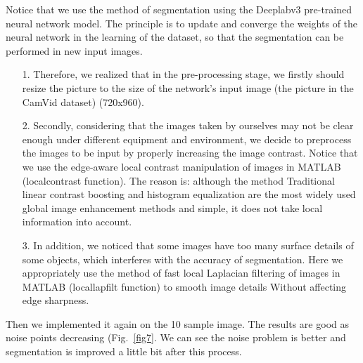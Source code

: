 \documentclass[10pt]{article}
\theoremstyle{nonumberplain}
\begin{document}
Notice that we use the method of segmentation using the Deeplabv3 pre-trained neural network model. The principle is to update and converge the weights of the neural network in the learning of the dataset, so that the segmentation can be performed in new input images. 

\begin{itemize}[itemsep=2pt,topsep=0pt,parsep=0pt]
	\item[1.] Therefore, we realized that in the pre-processing stage, we firstly should resize the picture to the size of the network’s input image (the picture in the CamVid dataset) (720x960). 
	\item[2.] Secondly, considering that the images taken by ourselves may not be clear enough under different equipment and environment, we decide to preprocess the images to be input by properly increasing the image contrast. Notice that we use the edge-aware local contrast manipulation of images in MATLAB (localcontrast function). The reason is: although the method Traditional linear contrast boosting and histogram equalization are the most widely used global image enhancement methods and simple, it does not take local information into account.
	\item[3.] In addition, we noticed that some images have too many surface details of some objects, which interferes with the accuracy of segmentation. Here we appropriately use the method of fast local Laplacian filtering of images in MATLAB (locallapfilt function) to smooth image details Without affecting edge sharpness.
\end{itemize}

Then we implemented it again on the 10 sample image. The results are good as noise points decreasing (Fig.~\ref{fig7}. We can see the noise problem is better and segmentation is improved a little bit after this process.
\end{document}
